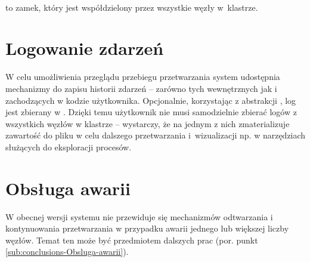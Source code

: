 \noindent %
\begin{minipage}[t]{1\textwidth}%
\begin{defn}
~

 to zamek, który jest współdzielony
przez wszystkie węzły w~klastrze.\end{defn}
%
\end{minipage}


\section{Logowanie zdarzeń}

W celu umożliwienia przeglądu przebiegu przetwarzania system udostępnia
mechanizmy do zapisu historii zdarzeń -- zarówno tych wewnętrznych
jak i zachodzących w kodzie użytkownika. Opcjonalnie, korzystając
z abstrakcji , log jest zbierany w .
Dzięki temu użytkownik nie musi samodzielnie zbierać logów z wszystkich
węzłów w klastrze -- wystarczy, że na jednym z nich zmaterializuje
zawartość  do pliku w celu dalszego przetwarzania
i~wizualizacji np. w narzędziach służących do eksploracji procesów.


\section{Obsługa awarii}

\label{sec:concept-Obsluga-awarii}W obecnej wersji systemu nie przewiduje
się mechanizmów odtwarzania i kontynuowania przetwarzania w przypadku
awarii jednego lub większej liczby węzłów. Temat ten może być przedmiotem
dalszych prac (por. punkt \ref{sub:conclusions-Obsluga-awarii}).
